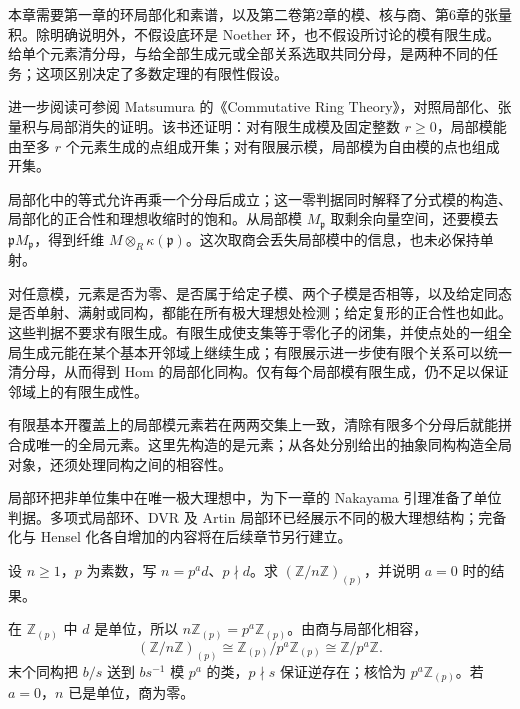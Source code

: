 本章需要第一章的环局部化和素谱，以及第二卷第2章的模、核与商、第6章的张量积。除明确说明外，不假设底环是 Noether 环，也不假设所讨论的模有限生成。给单个元素清分母，与给全部生成元或全部关系选取共同分母，是两种不同的任务；这项区别决定了多数定理的有限性假设。

\ProseParagraphBreak
进一步阅读可参阅 Matsumura 的《Commutative Ring Theory》\cite[Theorems 4.4--4.6, pp. 26--27]{Matsumura1989CommutativeRingTheory}，对照局部化、张量积与局部消失的证明。该书\cite[Theorem 4.10, pp. 28--29]{Matsumura1989CommutativeRingTheory}还证明：对有限生成模及固定整数 \(r\ge0\)，局部模能由至多 \(r\) 个元素生成的点组成开集；对有限展示模，局部模为自由模的点也组成开集。







\begin{chaptersummary}
	局部化中的等式允许再乘一个分母后成立；这一零判据同时解释了分式模的构造、局部化的正合性和理想收缩时的饱和。从局部模 \(M_{\mathfrak p}\) 取剩余向量空间，还要模去 \(\mathfrak pM_{\mathfrak p}\)，得到纤维 \(M\otimes_R\kappa(\mathfrak p)\)。这次取商会丢失局部模中的信息，也未必保持单射。

	\ProseParagraphBreak
	对任意模，元素是否为零、是否属于给定子模、两个子模是否相等，以及给定同态是否单射、满射或同构，都能在所有极大理想处检测；给定复形的正合性也如此。这些判据不要求有限生成。有限生成使支集等于零化子的闭集，并使点处的一组全局生成元能在某个基本开邻域上继续生成；有限展示进一步使有限个关系可以统一清分母，从而得到 Hom 的局部化同构。仅有每个局部模有限生成，仍不足以保证邻域上的有限生成性。

	\ProseParagraphBreak
	有限基本开覆盖上的局部模元素若在两两交集上一致，清除有限多个分母后就能拼合成唯一的全局元素。这里先构造的是元素；从各处分别给出的抽象同构构造全局对象，还须处理同构之间的相容性。

	\ProseParagraphBreak
	局部环把非单位集中在唯一极大理想中，为下一章的 Nakayama 引理准备了单位判据。多项式局部环、DVR 及 Artin 局部环已经展示不同的极大理想结构；完备化与 Hensel 化各自增加的内容将在后续章节另行建立。
\end{chaptersummary}

\BookExercises

\begin{exercise}\label{b3:ex:02-cyclic-integers}
	设 \(n\ge1\)，\(p\) 为素数，写 \(n=p^a d\)、\(p\nmid d\)。求 \((\mathbb Z/n\mathbb Z)_{(p)}\)，并说明 \(a=0\) 时的结果。
\end{exercise}
\begin{solution}
	在 \(\mathbb Z_{(p)}\) 中 \(d\) 是单位，所以 \(n\mathbb Z_{(p)}=p^a\mathbb Z_{(p)}\)。由商与局部化相容，
	\[
		(\mathbb Z/n\mathbb Z)_{(p)} \cong\mathbb Z_{(p)}/p^a\mathbb Z_{(p)} \cong\mathbb Z/p^a\mathbb Z.
	\]
	末个同构把 \(b/s\) 送到 \(b s^{-1}\) 模 \(p^a\) 的类，\(p\nmid s\) 保证逆存在；核恰为 \(p^a\mathbb Z_{(p)}\)。若 \(a=0\)，\(n\) 已是单位，商为零。
\end{solution}

